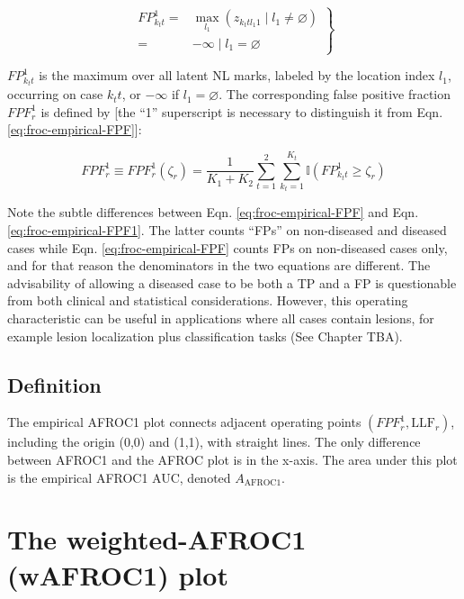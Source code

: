 \documentclass[
]{book}
\begin{document}
\begin{equation}
\left.
\begin{aligned}
FP_{k_t t}^1 =& \max_{l_1} \left ( z_{k_t t l_1 1 } \mid  l_1 \neq \varnothing \right )\\
=& -\infty \mid l_1 = \varnothing
\end{aligned}
\right \}
\label{eq:froc-empirical-FP1}
\end{equation}

\(FP_{k_t t}^1\) is the maximum over all latent NL marks, labeled by the location index \(l_1\), occurring on case \(k_t t\), or \(-\infty\) if \(l_1 = \varnothing\). The corresponding false positive fraction \(FPF_r^1\) is defined by {[}the ``1'' superscript is necessary to distinguish it from Eqn. \eqref{eq:froc-empirical-FPF}{]}:

\begin{equation}
FPF_r^1 \equiv FPF_r^1\left ( \zeta_r \right ) = \frac{1}{K_1+K_2}\sum_{t=1}^{2}\sum_{k_t=1}^{K_t} \mathbb{I}\left ( FP_{k_t t}^1 \geq \zeta_r \right )
\label{eq:froc-empirical-FPF1}
\end{equation}

Note the subtle differences between Eqn. \eqref{eq:froc-empirical-FPF} and Eqn. \eqref{eq:froc-empirical-FPF1}. The latter counts ``FPs'' on non-diseased and diseased cases while Eqn. \eqref{eq:froc-empirical-FPF} counts FPs on non-diseased cases only, and for that reason the denominators in the two equations are different. The advisability of allowing a diseased case to be both a TP and a FP is questionable from both clinical and statistical considerations. However, this operating characteristic can be useful in applications where all cases contain lesions, for example lesion localization plus classification tasks (See Chapter TBA).

\hypertarget{froc-empirical-definition-auc-AFROC1}{%
\subsection{Definition}\label{froc-empirical-definition-auc-AFROC1}}

The empirical AFROC1 plot connects adjacent operating points \(\left ( FPF_r^1, \text{LLF}_r \right )\), including the origin (0,0) and (1,1), with straight lines. The only difference between AFROC1 and the AFROC plot is in the x-axis. The area under this plot is the empirical AFROC1 AUC, denoted \(A_{\text{AFROC1}}\).

\hypertarget{froc-empirical-wAFROC1}{%
\section{The weighted-AFROC1 (wAFROC1) plot}\label{froc-empirical-wAFROC1}}
\end{document}
